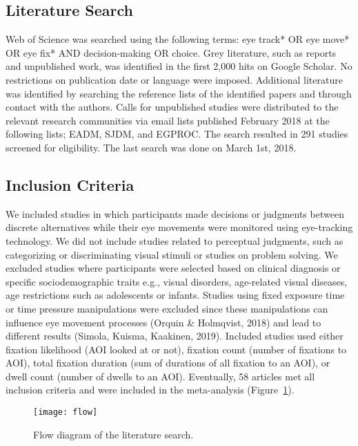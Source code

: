 \documentclass{article}
\begin{document}
\subsection{Literature Search}

Web of Science was searched using the following terms: eye track* OR eye move* OR eye fix* AND decision-making OR choice. Grey literature, such as reports and unpublished work, was identified in the first 2,000 hits on Google Scholar. No restrictions on publication date or language were imposed. Additional literature was identified by searching the reference lists of the identified papers and through contact with the authors. Calls for unpublished studies were distributed to the relevant research communities via email lists published February 2018 at the following lists; EADM, SJDM, and EGPROC. The search resulted in 291 studies screened for eligibility. The last search was done on March 1st, 2018.


\subsection{Inclusion Criteria}

We included studies in which participants made decisions or judgments between discrete alternatives while their eye movements were monitored using eye-tracking technology. We did not include studies related to perceptual judgments, such as categorizing or discriminating visual stimuli or studies on problem solving. We excluded studies where participants were selected based on clinical diagnosis or specific sociodemographic traits e.g., visual disorders, age-related visual diseases, age restrictions such as adolescents or infants. Studies using fixed exposure time or time pressure manipulations were excluded since these manipulations can influence eye movement processes (Orquin \& Holmqvist, 2018) and lead to different results (Simola, Kuisma, Kaakinen, 2019). Included studies used either fixation likelihood (AOI looked at or not), fixation count (number of fixations to AOI), total fixation duration (sum of durations of all fixation to an AOI), or dwell count (number of dwells to an AOI). Eventually, 58 articles met all inclusion criteria and were included in the meta-analysis (Figure~\ref{fig:flow_diagram}).


\begin{figure}[H]
\texttt{[image: flow]}
\centering
\caption{Flow diagram of the literature search.}
\label{fig:flow_diagram}
\end{figure}
\end{document}
